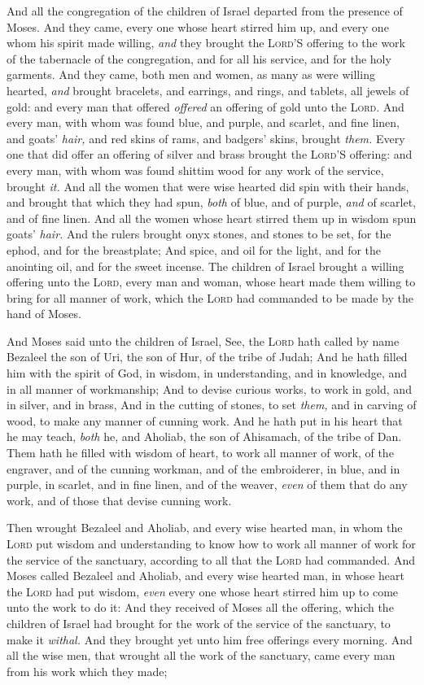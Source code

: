 \documentclass[11pt,letterpaper,oneside]{memoir}
\begin{document}
And all the congregation of the children of Israel departed from the
presence of Moses. And they came, every one whose heart stirred him up,
and every one whom his spirit made willing, \emph{and} they brought the
\textsc{Lord}'S offering to the work of the tabernacle of the
congregation, and for all his service, and for the holy garments. And
they came, both men and women, as many as were willing hearted,
\emph{and} brought bracelets, and earrings, and rings, and tablets, all
jewels of gold: and every man that offered \emph{offered} an offering of
gold unto the \textsc{Lord}. And every man, with whom was found blue,
and purple, and scarlet, and fine linen, and goats' \emph{hair,} and red
skins of rams, and badgers' skins, brought \emph{them. }Every one that
did offer an offering of silver and brass brought the \textsc{Lord}'S
offering: and every man, with whom was found shittim wood for any work
of the service, brought \emph{it. }And all the women that were wise
hearted did spin with their hands, and brought that which they had spun,
\emph{both} of blue, and of purple, \emph{and} of scarlet, and of fine
linen. And all the women whose heart stirred them up in wisdom spun
goats' \emph{hair. }And the rulers brought onyx stones, and stones to be
set, for the ephod, and for the breastplate; And spice, and oil for the
light, and for the anointing oil, and for the sweet incense. The
children of Israel brought a willing offering unto the \textsc{Lord},
every man and woman, whose heart made them willing to bring for all
manner of work, which the \textsc{Lord} had commanded to be made by the
hand of Moses.

And Moses said unto the children of Israel, See, the \textsc{Lord} hath
called by name Bezaleel the son of Uri, the son of Hur, of the tribe of
Judah; And he hath filled him with the spirit of God, in wisdom, in
understanding, and in knowledge, and in all manner of workmanship; And
to devise curious works, to work in gold, and in silver, and in brass,
And in the cutting of stones, to set \emph{them,} and in carving of
wood, to make any manner of cunning work. And he hath put in his heart
that he may teach, \emph{both} he, and Aholiab, the son of Ahisamach, of
the tribe of Dan. Them hath he filled with wisdom of heart, to work all
manner of work, of the engraver, and of the cunning workman, and of the
embroiderer, in blue, and in purple, in scarlet, and in fine linen, and
of the weaver, \emph{even} of them that do any work, and of those that
devise cunning work.

Then wrought Bezaleel and Aholiab, and every wise hearted man, in whom
the \textsc{Lord} put wisdom and understanding to know how to work all
manner of work for the service of the sanctuary, according to all that
the \textsc{Lord} had commanded. And Moses called Bezaleel and Aholiab,
and every wise hearted man, in whose heart the \textsc{Lord} had put
wisdom, \emph{even} every one whose heart stirred him up to come unto
the work to do it: And they received of Moses all the offering, which
the children of Israel had brought for the work of the service of the
sanctuary, to make it \emph{withal.} And they brought yet unto him free
offerings every morning. And all the wise men, that wrought all the work
of the sanctuary, came every man from his work which they made;
\end{document}
